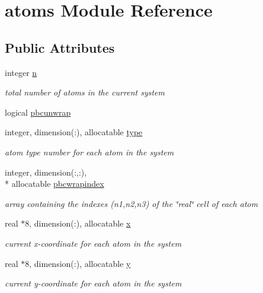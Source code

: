 \hypertarget{classatoms}{\section{atoms Module Reference}
\label{classatoms}
}
\subsection*{Public Attributes}
\begin{DoxyCompactItemize}
\item 
integer \hyperlink{classatoms_a0d62a0e654e2857f8d2a1ce12b6f6eb6}{n}
\begin{DoxyCompactList}\small\item\em total number of atoms in the current system \end{DoxyCompactList}\item 
logical \hyperlink{classatoms_abce3ab126f34592ae695a7216a3d7ebf}{pbcunwrap}
\item 
integer, dimension(\-:), allocatable \hyperlink{classatoms_a6394bcb06c217b3bd239a0b2a1514418}{type}
\begin{DoxyCompactList}\small\item\em atom type number for each atom in the system \end{DoxyCompactList}\item 
integer, dimension(\-:,\-:), \\*
allocatable \hyperlink{classatoms_a80a7224531ab022e4b4fd8712abc17ea}{pbcwrapindex}
\begin{DoxyCompactList}\small\item\em array containing the indexes (n1,n2,n3) of the \char`\"{}real\char`\"{} cell of each atom \end{DoxyCompactList}\item 
real $\ast$8, dimension(\-:), allocatable \hyperlink{classatoms_a9a9b5b4434a7f3b293a6d30a4f3bd0da}{x}
\begin{DoxyCompactList}\small\item\em current x-\/coordinate for each atom in the system \end{DoxyCompactList}\item 
real $\ast$8, dimension(\-:), allocatable \hyperlink{classatoms_acb7a284510ae51efb81ef1e3307a8323}{y}
\begin{DoxyCompactList}\small\item\em current y-\/coordinate for each atom in the system \end{DoxyCompactList}\item 

\end{DoxyCompactItemize}
